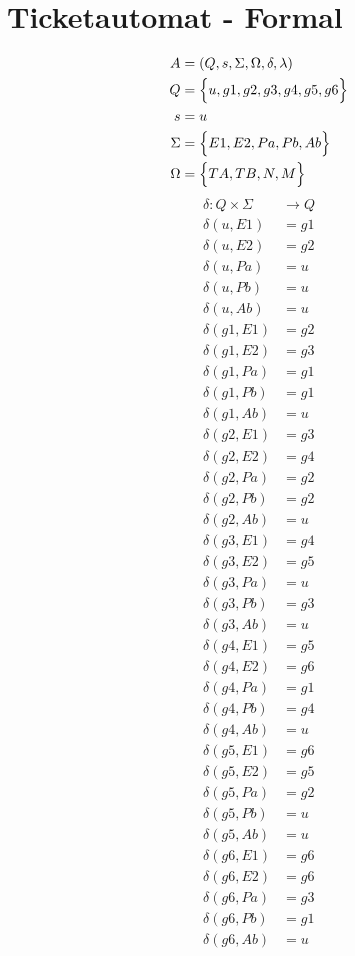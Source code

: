 \documentclass[12pt,a4paperx]{report}
\begin{document}
	\section{Ticketautomat - Formal}
	\begin{align*}
		A &= (Q,s,\Sigma, \Omega, \delta, \lambda) \\
		Q &= \Bigl\{u, g1, g2, g3, g4, g5, g6\Bigl\} \\
		s &= u \\
		\Sigma &= \Bigl\{E1, E2, Pa, Pb, Ab\Bigl\} \\
		\Omega &= \Bigl\{TA, TB, N, M\Bigl\} \\
	\end{align*}
	\begin{align*}
		\delta : Q \times \Sigma &\to Q \\
		\delta(u,E1) &= g1 \\
		\delta(u,E2) &= g2 \\
		\delta(u,Pa) &= u \\
		\delta(u,Pb) &= u \\
		\delta(u,Ab) &= u \\
		\delta(g1,E1) &= g2 \\
		\delta(g1,E2) &= g3 \\
		\delta(g1,Pa) &= g1 \\
		\delta(g1,Pb) &= g1 \\
		\delta(g1,Ab) &= u \\
		\delta(g2,E1) &= g3 \\
		\delta(g2,E2) &= g4 \\
		\delta(g2,Pa) &= g2 \\
		\delta(g2,Pb) &= g2 \\
		\delta(g2,Ab) &= u \\
		\delta(g3,E1) &= g4 \\
		\delta(g3,E2) &= g5 \\
		\delta(g3,Pa) &= u \\
		\delta(g3,Pb) &= g3 \\
		\delta(g3,Ab) &= u \\
		\delta(g4,E1) &= g5 \\
		\delta(g4,E2) &= g6 \\
		\delta(g4,Pa) &= g1 \\
		\delta(g4,Pb) &= g4 \\
		\delta(g4,Ab) &= u \\
		\delta(g5,E1) &= g6 \\
		\delta(g5,E2) &= g5 \\
		\delta(g5,Pa) &= g2 \\
		\delta(g5,Pb) &= u \\
		\delta(g5,Ab) &= u \\
		\delta(g6,E1) &= g6 \\
		\delta(g6,E2) &= g6 \\
		\delta(g6,Pa) &= g3 \\
		\delta(g6,Pb) &= g1 \\
		\delta(g6,Ab) &= u \\
	\end{align*}
\end{document}
